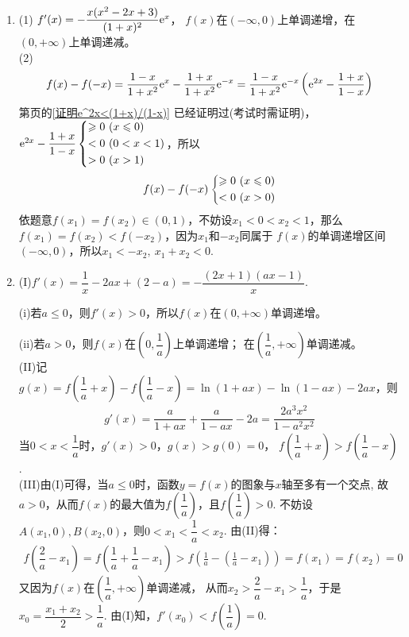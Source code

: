 \begin{enumerate}[label={\textbf{\arabic*.}},leftmargin=
    \inteval{\myenumleftmargin}pt]
\item (1) $ f'(x)=-\dfrac{x(x^2-2x+3)}{(1+x)^2}\e^x $，
$ f(x) $在$ (-\infty,0) $上单调递增，在$ (0,+\infty) $上单调递减。\\
(2) 
\begin{align*}
    f(x)-f(-x)=\dfrac{1-x}{1+x^2}\e^x-\dfrac{1+x}{1+x^2}\e^{-x}=
    \dfrac{1-x}{1+x^2}\e^{-x}\left(\e^{2x}-\dfrac{1+x}{1-x}\right)
\end{align*}
第\pageref{证明e^2x<(1+x)/(1-x)}页的\ref{证明e^2x<(1+x)/(1-x)}
已经证明过(考试时需证明)，$ \e^{2x}-\dfrac{1+x}{1-x}
\begin{dcases}
    \geq 0\ (x\leq 0) \\
    < 0\ (0<x<1) \\
    > 0\ (x>1)
\end{dcases}$，所以
\begin{gather*}
    f(x)-f(-x) \begin{dcases}
        \geq 0\ (x\leq 0) \\
        <0 \ (x>0) 
    \end{dcases}
\end{gather*}
依题意$ f(x_1)=f(x_2)\in (0,1) $，不妨设$ x_1<0<x_2<1 $，那么
$ f(x_1)=f(x_2)<f(-x_2) $，因为$ x_1 $和$ -x_2 $同属于
$ f(x) $的单调递增区间$ (-\infty,0) $，所以$ x_1<-x_2,\ x_1+x_2<0 $.

\item (I)$ f'(x)=\dfrac{1}{x}-2ax+(2-a)=-\dfrac{(2x+1)(ax-1)}{x} $. 

(i)若$a\leqslant 0$，则$f'(x)>0$，所以$f(x)$在$(0,+\infty)$单调递增。

(ii)若$a>0$，则$ f(x) $在$ \left(0,\dfrac{1}{a}\right) $上单调递增；
在$\left(\dfrac{1}{a},+\infty\right)$单调递减。\\
(II)记$g(x)=f\left(\dfrac{1}{a}+x\right)-f\left(\dfrac{1}{a}-x\right)
=\ln(1+ax)-\ln(1-ax)-2ax $，则
\begin{gather*}
    g'(x)=\dfrac{a}{1+ax}+\dfrac{a}{1-ax}-2a=\dfrac{2a^{3}x^{2}}{1-a^{2}x^{2}}
\end{gather*}
当$0<x<\dfrac{1}{a}$时，$g'(x)>0$，$ g(x)>g(0)=0 $，
$f\left(\dfrac{1}{a}+x\right)>f\left(\dfrac{1}{a}-x\right)$.\\
(III)由(I)可得，当$a\leqslant0$时，函数$y=f(x)$的图象与$x$轴至多有一个交点,
故$a>0$，从而$f(x)$的最大值为$f\left(\dfrac{1}{a}\right)$，且$f\left(\dfrac{1}{a}\right)>0$.
不妨设$A\left(x_{1},0\right),B\left(x_{2},0\right)$，则$0<x_{1}<\dfrac{1}{a}<x_{2}$.
由(II)得：
\begin{gather*}
    f\left(\dfrac{2}{a}-x_{1}\right)=f\left(\dfrac{1}{a}+\dfrac{1}{a}-x_{1}\right)
    >f\left(\frac{1}{a}-\left(\frac{1}{a}-x_{1}\right)\right)=
    f\left(x_{1}\right)=f\left(x_{2}\right)=0
\end{gather*}
又因为$f(x)$在$\left(\dfrac{1}{a},+\infty\right)$单调递减，
从而$x_{2}>\dfrac{2}{a}-x_{1}>\dfrac{1}{a} $，于是$x_{0}=\dfrac{x_{1}+x_{2}}{2}>\dfrac{1}{a}$.
由(I)知，$f'\left(x_{0}\right)<f\left(\dfrac{1}{a}\right)=0 $.


\end{enumerate}
